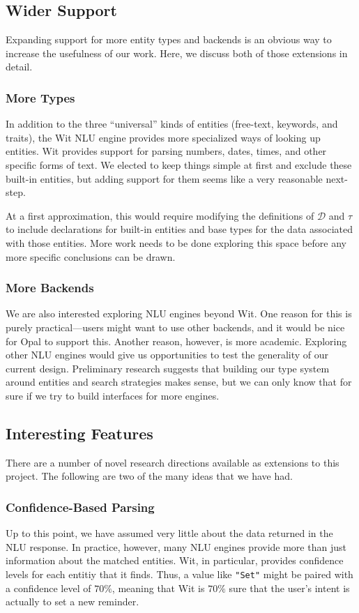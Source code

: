 \documentclass[twocolumn]{article}
\newcommand{\ts}[1]{\texttt{#1}}
\newcommand{\fcy}[1]{\mathcal{#1}}
\begin{document}
\subsection{Wider Support}
Expanding support for more entity types and backends is an obvious way to
increase the usefulness of our work. Here, we discuss both of those extensions
in detail.

\subsubsection{More Types}
In addition to the three ``universal'' kinds of entities (free-text, keywords,
and traits), the Wit NLU engine provides more specialized ways of looking up
entities. Wit provides support for parsing numbers, dates, times, and other
specific forms of text. We elected to keep things simple at first and exclude
these built-in entities, but adding support for them seems like a very
reasonable next-step.

At a first approximation, this would require modifying the definitions of
$\fcy{D}$ and $\tau$ to include declarations for built-in entities and
base types for the data associated with those entities. More work needs to be
done exploring this space before any more specific conclusions can be drawn.

\subsubsection{More Backends}
We are also interested exploring NLU engines beyond Wit. One reason for this is
purely practical---users might want to use other backends, and it would be nice
for Opal to support this. Another reason, however, is more academic. Exploring
other NLU engines would give us opportunities to test the generality of our
current design. Preliminary research suggests that building our type system
around entities and search strategies makes sense, but we can only know that for
sure if we try to build interfaces for more engines.

\subsection{Interesting Features}
There are a number of novel research directions available as extensions to this
project. The following are two of the many ideas that we have had.

\subsubsection{Confidence-Based Parsing}
Up to this point, we have assumed very little about the data returned in the NLU
response. In practice, however, many NLU engines provide more than just
information about the matched entities. Wit, in particular, provides confidence
levels for each entitiy that it finds. Thus, a value like \ts{"Set"} might be
paired with a confidence level of $70\%$, meaning that Wit is $70\%$ sure that
the user's intent is actually to set a new reminder.
\end{document}

